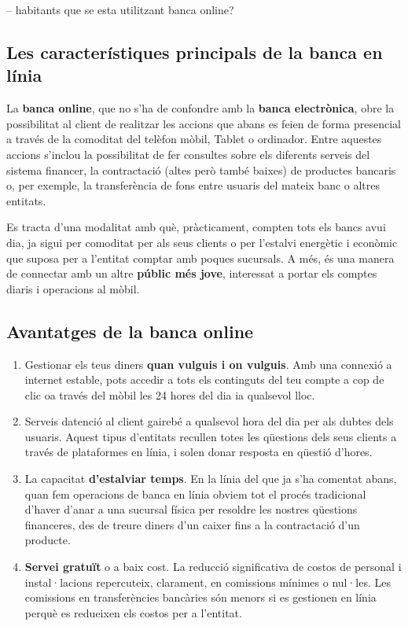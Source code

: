 -- habitants que se esta utilitzant banca online?


\subsection*{Les característiques principals de la banca en línia}

La \textbf{banca online}, que no s'ha de confondre amb la \textbf{banca electrònica}, obre la possibilitat al client de realitzar les accions que abans es feien de forma presencial a través de la comoditat del telèfon mòbil, Tablet o ordinador. Entre aquestes accions s'inclou la possibilitat de fer consultes sobre els diferents serveis del sistema financer, la contractació (altes però també baixes) de productes bancaris o, per exemple, la transferència de fons entre usuaris del mateix banc o altres entitats.

Es tracta d'una modalitat amb què, pràcticament, compten tots els bancs avui dia, ja sigui per comoditat per als seus clients o per l'estalvi energètic i econòmic que suposa per a l'entitat comptar amb poques sucursals. A més, és una manera de connectar amb un altre \textbf{públic més jove}, interessat a portar els comptes diaris i operacions al mòbil.


\subsection*{Avantatges de la banca online}


\begin{enumerate}
    \item Gestionar els teus diners \textbf{quan vulguis i on vulguis}. Amb una connexió a internet estable, pots accedir a tots els continguts del teu compte a cop de clic oa través del mòbil les 24 hores del dia ia qualsevol lloc.
    \item Serveis datenció al client gairebé a qualsevol hora del dia per als dubtes dels usuaris. Aquest tipus d'entitats recullen totes les qüestions dels seus clients a través de plataformes en línia, i solen donar resposta en qüestió d'hores.
    \item La capacitat \textbf{d'estalviar temps}. En la línia del que ja s'ha comentat abans, quan fem operacions de banca en línia obviem tot el procés tradicional d'haver d'anar a una sucursal física per resoldre les nostres qüestions financeres, des de treure diners d'un caixer fins a la contractació d'un producte.
    \item \textbf{Servei gratuït} o a baix cost. La reducció significativa de costos de personal i instal·lacions repercuteix, clarament, en comissions mínimes o nul·les. Les comissions en transferències bancàries són menors si es gestionen en línia perquè es redueixen els costos per a l'entitat.
\end{enumerate}




